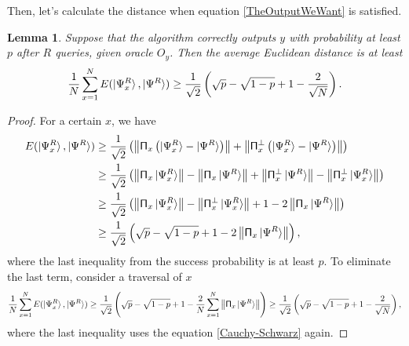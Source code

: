 \documentclass[a4paper,10pt]{book}
\newtheorem{lemma}{Lemma}[section]
\numberwithin{equation}{section}
\begin{document}
Then, let's calculate the distance when equation \ref{TheOutputWeWant} is satisfied.
\begin{lemma}
    Suppose that the algorithm correctly outputs $y$ with probability at least $p$ after $R$ queries, given oracle $O_{y}$. Then the average Euclidean distance is at least
    \begin{equation}
        \frac{1}{N}\sum_{x=1}^{N}E(\ket{\Psi_{x}^{R}},\ket{\Psi^{R}})\geq \frac{1}{\sqrt{2}}\left(\sqrt{p}-\sqrt{1-p}+1-\frac{2}{\sqrt{N}}\right).
    \end{equation}
\end{lemma}
\begin{proof}
    For a certain $x$, we have
    \begin{equation*}
        \begin{split}
            E(\ket{\Psi_{x}^{R}},\ket{\Psi^{R}})
             & \geq \frac{1}{\sqrt{2}}\left(\left\|\mathsf{\Pi}_{x}\left(\ket{\Psi_{x}^{R}}-\ket{\Psi^{R}}\right)\right\|+\left\|\mathsf{\Pi}_{x}^{\perp}\left(\ket{\Psi_{x}^{R}}-\ket{\Psi^{R}}\right)\right\|\right)                                             \\
             & \geq \frac{1}{\sqrt{2}}\left(\left\|\mathsf{\Pi}_{x}\ket{\Psi_{x}^{R}}\right\|-\left\|\mathsf{\Pi}_{x}\ket{\Psi^{R}}\right\|+\left\|\mathsf{\Pi}_{x}^{\perp}\ket{\Psi^{R}}\right\|-\left\|\mathsf{\Pi}_{x}^{\perp}\ket{\Psi_{x}^{R}}\right\|\right) \\
             & \geq \frac{1}{\sqrt{2}}\left(\left\|\mathsf{\Pi}_{x}\ket{\Psi_{x}^{R}}\right\|-\left\|\mathsf{\Pi}_{x}^{\perp}\ket{\Psi_{x}^{R}}\right\|+1-2\left\|\mathsf{\Pi}_{x}\ket{\Psi^{R}}\right\|\right)                                                    \\
             & \geq \frac{1}{\sqrt{2}}\left(\sqrt{p}-\sqrt{1-p}+1-2\left\|\mathsf{\Pi}_{x}\ket{\Psi^{R}}\right\|\right),
        \end{split}
    \end{equation*}
    where the last inequality from the success probability is at least $p$. To eliminate the last term, consider a traversal of $x$
    \begin{equation*}
        \frac{1}{N}\sum_{x=1}^{N}E(\ket{\Psi_{x}^{R}},\ket{\Psi^{R}})
        \geq \frac{1}{\sqrt{2}}\left(\sqrt{p}-\sqrt{1-p}+1-\frac{2}{N}\sum_{x=1}^{N}\left\|\mathsf{\Pi}_{x}\ket{\Psi^{R}}\right\|\right)
        \geq \frac{1}{\sqrt{2}}\left(\sqrt{p}-\sqrt{1-p}+1-\frac{2}{\sqrt{N}}\right),
    \end{equation*}
    where the last inequality uses the equation \ref{Cauchy-Schwarz} again.
\end{proof}
\end{document}
